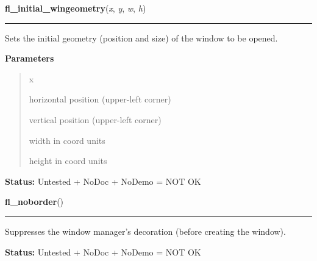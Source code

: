 \hspace{.8\funcindent}\begin{boxedminipage}{\funcwidth}

    \raggedright \textbf{fl\_initial\_wingeometry}(\textit{x}, \textit{y}, \textit{w}, \textit{h})

    \vspace{-1.5ex}

    \rule{\textwidth}{0.5\fboxrule}
\setlength{\parskip}{2ex}
    Sets the initial geometry (position and size) of the window to be 
    opened.

\setlength{\parskip}{1ex}
      \textbf{Parameters}
      \vspace{-1ex}

      \begin{quote}
        \begin{Ventry}{x}

          \item[x]

          horizontal position (upper-left corner)

          \item[y]

          vertical position (upper-left corner)

          \item[w]

          width in coord units

          \item[h]

          height in coord units

        \end{Ventry}

      \end{quote}

\textbf{Status:} Untested + NoDoc + NoDemo = NOT OK



    \end{boxedminipage}

    \label{xformslib:library:fl_noborder}

    \vspace{0.5ex}

\hspace{.8\funcindent}\begin{boxedminipage}{\funcwidth}

    \raggedright \textbf{fl\_noborder}()

    \vspace{-1.5ex}

    \rule{\textwidth}{0.5\fboxrule}
\setlength{\parskip}{2ex}
    Suppresses the window manager's decoration (before creating the 
    window).

\setlength{\parskip}{1ex}
\textbf{Status:} Untested + NoDoc + NoDemo = NOT OK



    \end{boxedminipage}

